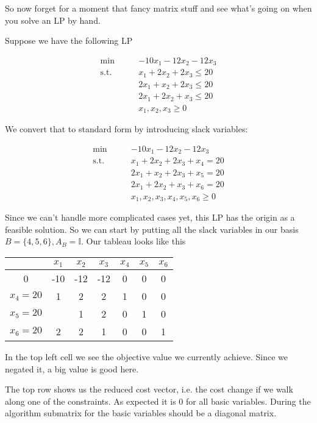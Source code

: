 \begin{Ex} So now forget for a moment that fancy matrix stuff and see what's going on when you solve an LP by hand.

Suppose we have the following LP

\begin{align*}
\min \qquad& -10 x_1 - 12 x_2 - 12 x_3\\
\text{s.t.}\qquad & x_1 + 2 x_2 +2 x_3 \leq 20\\
& 2x_1 + x_2 + 2 x_3\leq 20\\
& 2x_1 + 2 x_2 + x_3\leq 20\\
& x_1,x_2,x_3 \geq 0
\end{align*}

We convert that to standard form by introducing slack variables:

\begin{align*}
\min \qquad 	  & -10 x_1 -12 x_2 -12 x_3 \\
\text{s.t.}\qquad & x_1 + 2 x_2 + 2 x_3 + x_4 = 20\\
		  & 2x_1 + x_2 + 2 x_3 + x_5  = 20\\
		  & 2 x_1 + 2 x_2 + x_3 + x_6 = 20\\
		  & x_1,x_2,x_3,x_4,x_5,x_6   \geq 0
\end{align*}

Since we can't handle more complicated cases yet, this LP has the origin as a feasible solution. So we can start by putting all the slack variables in our basis $B=\{4,5,6\}, A_B=\mathbb{I}$. Our tableau looks like this

\begin{center}
\begin{tabular}{c|cccccc}\label{tab:pivotExample}
  & $x_1$ & $x_2$ & $x_3$ & $x_4$ & $x_5$ & $x_6$ \\\hline
0 & -10 & -12 & -12 & 0 & 0 & 0\\\hline
$x_4=20$ & 1 & 2 & 2 & 1 &  0 & 0 \\
$x_5=20$ & \cellcolor{gruen}{\bf 2} & 1 & 2 & 0 &  1 & 0\\
$x_6=20$ & 2 & 2 & 1 & 0 &  0 & 1\\
\end{tabular}
\end{center}

In the top left cell we see the objective value we currently achieve. Since we negated it, a big value is good here.

The top row shows us the reduced cost vector, i.e. the cost change if we walk along one of the constraints. As expected it is 0 for all basic variables. During the algorithm submatrix for the basic variables should be a diagonal matrix. 


\end{Ex}
